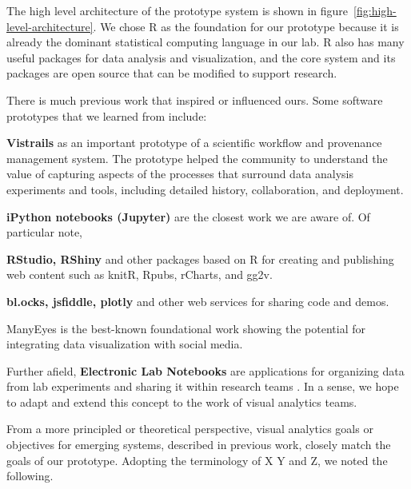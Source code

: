 The high level architecture of the prototype system
is shown in figure~\ref{fig:high-level-architecture}.
We chose R as the foundation for our prototype because it is already
the dominant statistical computing language in our lab.
R also has many useful packages for data analysis and visualization,
and the core system and its packages are open source that can be modified to
support research. 

There is much previous work that inspired or influenced ours. Some
software prototypes that we learned from include:

{\bf Vistrails} as an important prototype of a scientific workflow
and provenance management system. The prototype helped the community
to understand the value of capturing aspects of the processes that
surround data analysis experiments and tools, including detailed
history, collaboration, and deployment.

{\bf iPython notebooks (Jupyter)} are the closest work we are aware of.
Of particular note, 

{\bf RStudio, RShiny} and other packages based on R for creating and
publishing web content such as knitR, Rpubs, rCharts, and gg2v.

{\bf bl.ocks, jsfiddle, plotly} and other web services for sharing code
and demos.

{ManyEyes} is the best-known foundational work showing the potential for
integrating data visualization with social media.

Further afield, {\bf Electronic Lab Notebooks} are applications for organizing
data from lab experiments and sharing it within research teams \cite{Rubacha:ELN:2011}. In a sense, we hope to adapt and extend this concept to the work of
visual analytics teams.

From a more principled or theoretical perspective, visual analytics goals
or objectives for emerging systems, described in previous work, closely match
the goals of our prototype.  Adopting the terminology of X Y and Z, we noted
the following.

